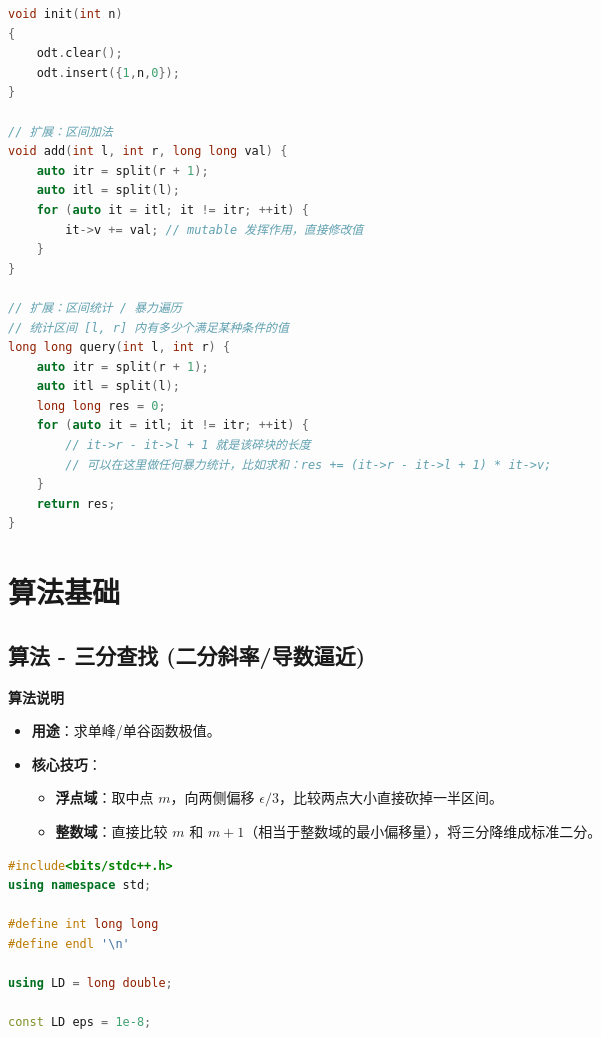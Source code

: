 \documentclass[10pt,landscape,a4paper]{article}
\begin{document}
\begin{multicols*}{3}
\begin{lstlisting}[language=C++]
void init(int n)
{
    odt.clear();
    odt.insert({1,n,0});
}

// 扩展：区间加法
void add(int l, int r, long long val) {
    auto itr = split(r + 1);
    auto itl = split(l);
    for (auto it = itl; it != itr; ++it) {
        it->v += val; // mutable 发挥作用，直接修改值
    }
}

// 扩展：区间统计 / 暴力遍历
// 统计区间 [l, r] 内有多少个满足某种条件的值
long long query(int l, int r) {
    auto itr = split(r + 1);
    auto itl = split(l);
    long long res = 0;
    for (auto it = itl; it != itr; ++it) {
        // it->r - it->l + 1 就是该碎块的长度
        // 可以在这里做任何暴力统计，比如求和：res += (it->r - it->l + 1) * it->v;
    }
    return res;
}
\end{lstlisting}
\section*{算法基础}
\subsection*{算法 - 三分查找 (二分斜率/导数逼近)}
\par\addvspace{0.7ex}\noindent\textbf{算法说明}\par\nobreak
\begin{itemize}
\item \textbf{用途}：求单峰/单谷函数极值。
\item \textbf{核心技巧}：
\begin{itemize}
\item \textbf{浮点域}：取中点 $m$，向两侧偏移 $\epsilon/3$，比较两点大小直接砍掉一半区间。
\item \textbf{整数域}：直接比较 $m$ 和 $m+1$（相当于整数域的最小偏移量），将三分降维成标准二分。
\end{itemize}
\end{itemize}
\par{}\par
\begin{lstlisting}[language=C++]
#include<bits/stdc++.h>
using namespace std;

#define int long long
#define endl '\n'

using LD = long double;

const LD eps = 1e-8;


\end{lstlisting}
\end{multicols*}
\end{document}
